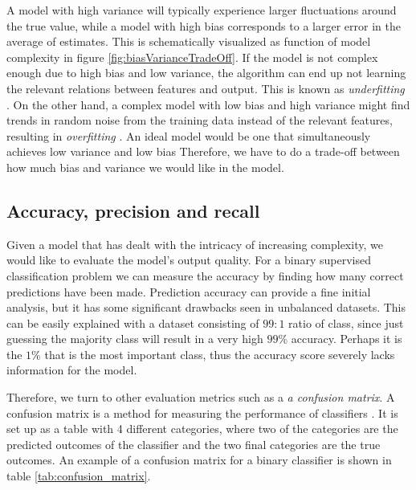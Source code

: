

A model with high variance will typically experience larger fluctuations around the true value, while a model with high bias corresponds to a larger error in the average of estimates. This is schematically visualized as function of model complexity in figure  \ref{fig:biasVarianceTradeOff}. If the model is not complex enough due to high bias and low variance, the algorithm can end up not learning the relevant relations between features and output. This is known as \textit{underfitting} \cite{Murphy2012}. On the other hand, a complex model with low bias and high variance might find trends in random noise from the training data instead of the relevant features, resulting in \textit{overfitting} \cite{Murphy2012}. An ideal model would be one that simultaneously achieves low variance and low bias  Therefore, we have to do a trade-off between how much bias and variance we would like in the model.

\subsection{Accuracy, precision and recall}

Given a model that has dealt with the intricacy of increasing complexity, we would like to evaluate the model's output quality. For a binary supervised classification problem we can measure the accuracy by finding how many correct predictions have been made. Prediction accuracy can provide a fine initial analysis, but it has some significant drawbacks seen in unbalanced datasets. This can be easily explained with a dataset consisting of $99:1$ ratio of class, since just guessing the majority class will result in a very high $99\%$ accuracy. Perhaps it is the $1\%$ that is the most important class, thus the accuracy score severely lacks information for the model.

Therefore, we turn to other evaluation metrics such as a \textit{a confusion matrix}. A confusion matrix is a method for measuring the performance of classifiers \cite{Murphy2012}. It is set up as a table with 4 different categories, where two of the categories are the predicted outcomes of the classifier and the two final categories are the true outcomes. An example of a confusion matrix for a binary classifier is shown in table \ref{tab:confusion_matrix}.


